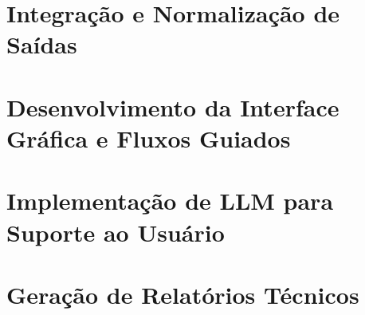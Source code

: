 \section{Integração e Normalização de Saídas}

\section{Desenvolvimento da Interface Gráfica e Fluxos Guiados}

\section{Implementação de LLM para Suporte ao Usuário}

\section{Geração de Relatórios Técnicos}